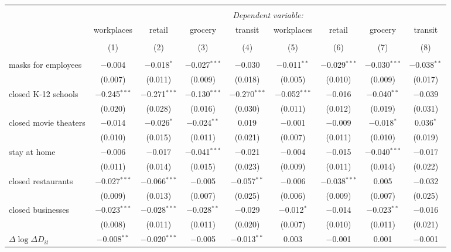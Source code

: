 \begin{tabular}{@{\extracolsep{1pt}}lcccccccc} 
\\[-1.8ex]\hline 
\hline \\[-1.8ex] 
 & \multicolumn{8}{c}{\textit{Dependent variable:}} \\ 
\cline{2-9} 
 & workplaces & retail & grocery & transit & workplaces & retail & grocery & transit \\ 
\\[-1.8ex] & (1) & (2) & (3) & (4) & (5) & (6) & (7) & (8)\\ 
\hline \\[-1.8ex] 
 masks for employees & $-$0.004 & $-$0.018$^{*}$ & $-$0.027$^{***}$ & $-$0.030 & $-$0.011$^{**}$ & $-$0.029$^{***}$ & $-$0.030$^{***}$ & $-$0.038$^{**}$ \\ 
  & (0.007) & (0.011) & (0.009) & (0.018) & (0.005) & (0.010) & (0.009) & (0.017) \\ 
  closed K-12 schools & $-$0.245$^{***}$ & $-$0.271$^{***}$ & $-$0.130$^{***}$ & $-$0.270$^{***}$ & $-$0.052$^{***}$ & $-$0.016 & $-$0.040$^{**}$ & $-$0.039 \\ 
  & (0.020) & (0.028) & (0.016) & (0.030) & (0.011) & (0.012) & (0.019) & (0.031) \\ 
  closed movie theaters & $-$0.014 & $-$0.026$^{*}$ & $-$0.024$^{**}$ & 0.019 & $-$0.001 & $-$0.009 & $-$0.018$^{*}$ & 0.036$^{*}$ \\ 
  & (0.010) & (0.015) & (0.011) & (0.021) & (0.007) & (0.011) & (0.010) & (0.019) \\ 
  stay at home & $-$0.006 & $-$0.017 & $-$0.041$^{***}$ & $-$0.021 & $-$0.004 & $-$0.015 & $-$0.040$^{***}$ & $-$0.017 \\ 
  & (0.011) & (0.014) & (0.015) & (0.023) & (0.009) & (0.011) & (0.014) & (0.022) \\ 
  closed restaurants & $-$0.027$^{***}$ & $-$0.066$^{***}$ & $-$0.005 & $-$0.057$^{**}$ & $-$0.006 & $-$0.038$^{***}$ & 0.005 & $-$0.032 \\ 
  & (0.009) & (0.013) & (0.007) & (0.025) & (0.006) & (0.009) & (0.007) & (0.025) \\ 
  closed businesses & $-$0.023$^{***}$ & $-$0.028$^{***}$ & $-$0.028$^{**}$ & $-$0.029 & $-$0.012$^{*}$ & $-$0.014 & $-$0.023$^{**}$ & $-$0.016 \\ 
  & (0.008) & (0.011) & (0.011) & (0.020) & (0.007) & (0.010) & (0.011) & (0.021) \\ 
  $\Delta \log \Delta D_{it}$ & $-$0.008$^{**}$ & $-$0.020$^{***}$ & $-$0.005 & $-$0.013$^{**}$ & 0.003 & $-$0.001 & 0.001 & $-$0.001 \\ 

\end{tabular}
